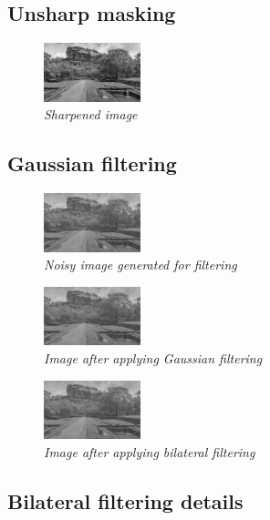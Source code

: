 \documentclass[11pt,twocolumn]{article}
\begin{document}
\subsection{Unsharp masking}
\begin{figure}[H]
\center
\includegraphics[width=0.25\textwidth]{Unsharp_Image.png}
\caption{{\small \textit{Sharpened image}}}
\end{figure}


\subsection{Gaussian filtering}
\begin{figure}[H]
\center
\includegraphics[width=0.25\textwidth]{Noisy_Image.png}
\caption{{\small \textit{Noisy image generated for filtering}}}
\end{figure}
\begin{figure}[H]
\center
\includegraphics[width=0.25\textwidth]{Gauss_filt_Image.png}
\caption{{\small \textit{Image after applying Gaussian filtering}}}
\end{figure}

\begin{figure}[H]
\center
\includegraphics[width=0.25\textwidth]{Bilateral_Image.png}
\caption{{\small \textit{Image after applying bilateral filtering}}}
\end{figure}
\subsection{Bilateral filtering details}
\end{document}
